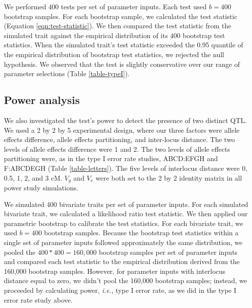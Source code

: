 \documentclass[12pt,twoside, lineno]{gsajnl}
\begin{document}
We performed 400 tests per set of parameter inputs. Each test used $b = 400$ bootstrap samples. For each bootstrap sample, we calculated the test statistic (Equation \ref{eqn:test-statistic}). We then compared the test statistic from the simulated trait against the empirical distribution of its 400 bootstrap test statistics. When the simulated trait's test statistic exceeded the 0.95 quantile of the empirical distribution of bootstrap test statistics, we rejected the null hypothesis. We observed that the test is slightly conservative over our range of parameter selections (Table \ref{table-typeI}).


\subsection{Power analysis}

We also investigated the test's power to detect the presence of two distinct QTL. We used a 2 by 2 by 5 experimental design, where our three factors were allele effects difference, allele effects partitioning, and inter-locus distance. The two levels of allele effects difference were 1 and 2. The two levels of allele effects partitioning were, as in the type I error rate studies, ABCD:EFGH and F:ABCDEGH (Table \ref{table-letters}). The five levels of interlocus distance were 0, 0.5, 1, 2, and 3 cM. $V_g$ and $V_e$ were both set to the 2 by 2 identity matrix in all power study simulations.

We simulated 400 bivariate traits per set of parameter inputs. For each simulated bivariate trait, we calculated a likelihood ratio test statistic. We then applied our parametric bootstrap to calibrate the test statistics. For each bivariate trait, we used $b = 400$ bootstrap samples. Because the bootstrap test statistics within a single set of parameter inputs followed approximately the same distribution, we pooled the $400 * 400 = 160,000$ bootstrap samples per set of parameter inputs and compared each test statistic to the empirical distribution derived from the 160,000 bootstrap samples. However, for parameter inputs with interlocus distance equal to zero, we didn't pool the 160,000 bootstrap samples; instead, we proceeded by calculating power, \textit{i.e.}, type I error rate, as we did in the type I error rate study above.
\end{document}
